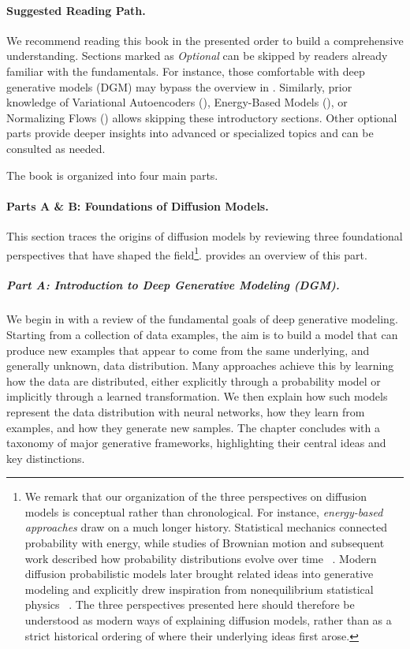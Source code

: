 \paragraph{Suggested Reading Path.}  
We recommend reading this book in the presented order to build a comprehensive understanding. Sections marked as \emph{Optional} can be skipped by readers already familiar with the fundamentals. For instance, those comfortable with deep generative models (DGM) may bypass the overview in . Similarly, prior knowledge of Variational Autoencoders (), Energy-Based Models (), or Normalizing Flows () allows skipping these introductory sections. Other optional parts provide deeper insights into advanced or specialized topics and can be consulted as needed.

The book is organized into four main parts.
\paragraph{Parts A \& B: Foundations of Diffusion Models.}
This section traces the origins of diffusion models by reviewing three foundational perspectives that have shaped the field\footnote{We remark that our organization of the three perspectives on diffusion
models is conceptual rather than chronological. For instance,
\emph{energy-based approaches} draw on a much longer history.
Statistical mechanics connected probability with energy, while studies
of Brownian motion and subsequent work described how probability
distributions evolve over time
~\citep{gibbs1902elementary,langevin1908brownian,fokker1914mittlere,planck1917satz,kolmogorov1931}. Modern diffusion probabilistic
models later brought related ideas into generative modeling and
explicitly drew inspiration from nonequilibrium statistical physics
~\citep{sohl2015deep}. The three perspectives presented here
should therefore be understood as modern ways of explaining diffusion
models, rather than as a strict historical ordering of where their
underlying ideas first arose.}.  provides an overview of this part.

\subparagraph{Part A: Introduction to Deep Generative Modeling (DGM).}
We begin in  with a review of the fundamental goals of deep generative modeling. Starting from a collection of data examples, the aim is to build a model that can produce new examples that appear to come from the same underlying, and generally unknown, data distribution. Many approaches achieve this by learning how the data are distributed, either explicitly through a probability model or implicitly through a learned transformation. We then explain how such models represent the data distribution with neural networks, how they learn from examples, and how they generate new samples. The chapter concludes with a taxonomy of major generative frameworks, highlighting their central ideas and key distinctions.






